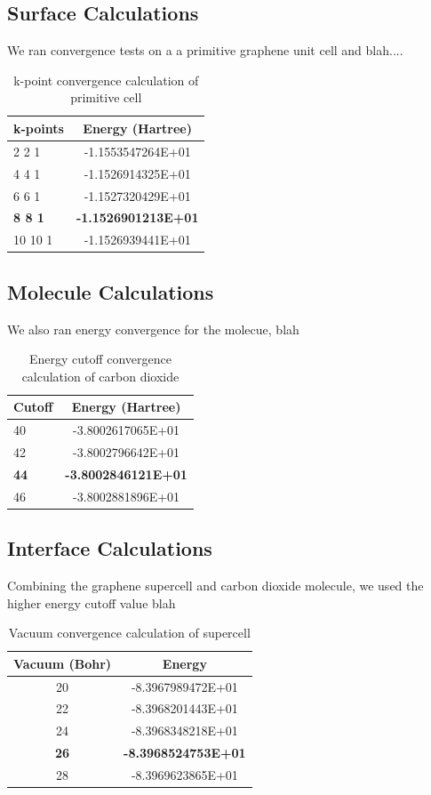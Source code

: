 \documentclass[letterpaper,showpacs,prb,preprint]{revtex4}
\begin{document}
\subsection{Surface Calculations}

We ran convergence tests on a a primitive graphene unit cell and  blah....

\begin{table}[hpt]
\caption{k-point convergence calculation of primitive cell}
\begin{tabular}{l c}
k-points&Energy (Hartree)\\
\hline
\hline
2 2 1&-1.1553547264E+01\\
4 4 1&-1.1526914325E+01\\
6 6 1&-1.1527320429E+01\\
\textbf{8 8 1}&\textbf{-1.1526901213E+01}\\
10 10 1&-1.1526939441E+01\\
\end{tabular}
\label{kpt1}
\end{table}


\subsection{Molecule Calculations}

We also ran energy convergence for the molecue, blah

\begin{table}[hpt]
\caption{Energy cutoff convergence calculation of carbon dioxide}
\begin{tabular}{l c}
Cutoff&Energy (Hartree)\\
\hline
\hline
40&-3.8002617065E+01\\
42&-3.8002796642E+01\\
\textbf{44}&\textbf{-3.8002846121E+01}\\
46&-3.8002881896E+01\\
\end{tabular}
\label{ecut}
\end{table}

\subsection{Interface Calculations}

Combining the graphene supercell and carbon dioxide molecule, we used the higher energy cutoff value blah

\begin{table}[hpt]
\caption{Vacuum convergence calculation of supercell}
\begin{tabular}{c c}
Vacuum (Bohr)&Energy\\
\hline
\hline
20&-8.3967989472E+01\\
22&-8.3968201443E+01\\
24&-8.3968348218E+01\\
\textbf{26}&\textbf{-8.3968524753E+01}\\
28&-8.3969623865E+01\\
\end{tabular}
\label{vacuum}
\end{table}
\end{document}
